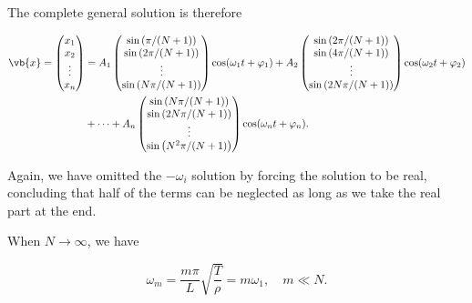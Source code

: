 \documentclass[a4paper,12pt]{report}
\begin{document}
The complete general solution is therefore

\begin{equation}
	\begin{aligned} 
	\vb{x} = \begin{pmatrix}
		 x_1  \\
		 x_2  \\
		 \vdots  \\
		 x_{n}  \\
	\end{pmatrix} &= A_1  \begin{pmatrix}
		 \sin \left( \pi /(N+1)  \right) \\
		 \sin \left( 2\pi /(N+1)  \right) \\
		 \vdots  \\
		 \sin \left( N\pi /(N+1)  \right) \\
	\end{pmatrix}\cos (\omega _{1}t+ \varphi _{1}  ) + A_2 \begin{pmatrix}
		 \sin \left( 2\pi /(N+1)  \right) \\
		 \sin \left( 4\pi /(N+1)  \right) \\
		 \vdots  \\
		 \sin \left( 2N\pi /(N+1)  \right) \\
	\end{pmatrix} \cos (\omega _{2}t+\varphi _{2}  ) \\
	&+ \cdots + A_{n} \begin{pmatrix}
		 \sin \left( N\pi /(N+1)  \right) \\
		 \sin \left( 2N\pi /(N+1)  \right) \\
		 \vdots  \\
		 \sin \left( N^2\pi /(N+1)  \right) \\
	\end{pmatrix}\cos (\omega _{n}t+\varphi _{n}  ).
	\end{aligned} 
\end{equation}

Again, we have omitted the \(-\omega _{i} \) solution by forcing the solution to be real, concluding that half of the terms can be neglected as long as we take the real part at the end. 

When \(N \to \infty\), we have 

\begin{equation}
	\omega _{m} =  \frac{m\pi }{L} \sqrt{\frac{T}{\rho } } = m \omega _{1} , \quad m \ll N.
\end{equation}
\end{document}

